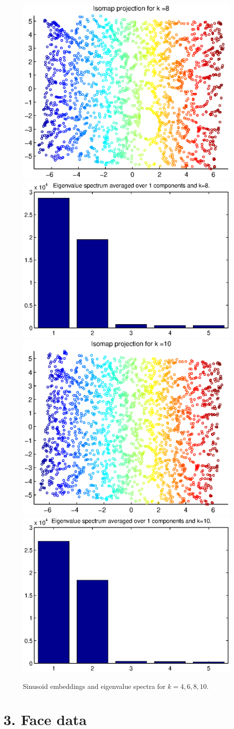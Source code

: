 \documentclass[a4paper,12pt]{report}
\begin{document}
\begin{figure}
\includegraphics[width = .4\textwidth]{figures/sinusoid_embedding_k=8}
\includegraphics[width = .4\textwidth]{figures/sinusoid_barplot_k=8}\\ 
\includegraphics[width = .4\textwidth]{figures/sinusoid_embedding_k=10}
\includegraphics[width = .4\textwidth]{figures/sinusoid_barplot_k=10}\\ 
\caption{Sinusoid embeddings and eigenvalue spectra for $k=4, 6, 8,  10$.}
\label{fig:sinus_embeddings}
\end{figure}

\section*{3. Face data}
\end{document}
